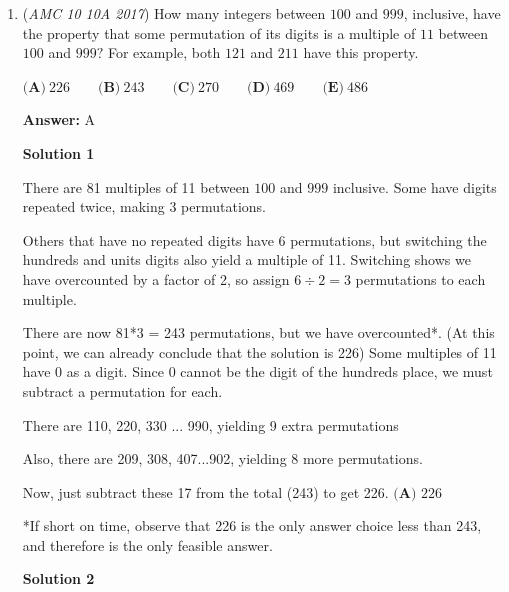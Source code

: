 \begin{enumerate}
 $f(x)/g(x) = x+r$ must have real $r$. Both $f$ and $g$ have all real coefficients, and so odd-degree $g$ must have an odd number of real roots, and even-degree $f$ must have an even number of real roots, so $f$'s single additional root must be real.

 
$77 * 91 = 7 * 11 * 7 * 13$, and $7*11*13=1001$ is a good number sense fact to know. It's interesting because $1001= 10^3+1$ and the 3 nearest primes to $10$ are $7,11,13$.

 


	\item (\textit{AMC 10 10A 2017}) How many integers between $100$ and $999$, inclusive, have the property that some permutation of its digits is a multiple of $11$ between $100$ and $999?$ For example, both $121$ and $211$ have this property.


 $\textbf{(A)}\ 226\qquad\textbf{(B)}\ 243\qquad\textbf{(C)}\ 270\qquad\textbf{(D)}\ 469\qquad\textbf{(E)}\ 486$

 \textbf{Answer: }A



\textbf{Solution 1}

There are 81 multiples of 11 between $100$ and $999$ inclusive. Some have digits repeated twice, making 3 permutations.

 Others that have no repeated digits have 6 permutations, but switching the hundreds and units digits also yield a multiple of 11. Switching shows we have overcounted by a factor of 2, so assign  $6 \div 2 = 3$ permutations to each multiple.

 There are now 81*3 = 243 permutations, but we have overcounted*. (At this point, we can already conclude that the solution is 226) Some multiples of 11 have $0$ as a digit. Since $0$ cannot be the digit of the hundreds place, we must subtract a permutation for each. 

 There are 110, 220, 330 ... 990, yielding 9 extra permutations

 Also, there are 209, 308, 407...902, yielding 8 more permutations.

 Now, just subtract these 17 from the total (243) to get 226. $\boxed{\textbf{(A) } 226}$

 *If short on time, observe that 226 is the only answer choice less than 243, and therefore is the only feasible answer.

 



\textbf{Solution 2}


\end{enumerate}
